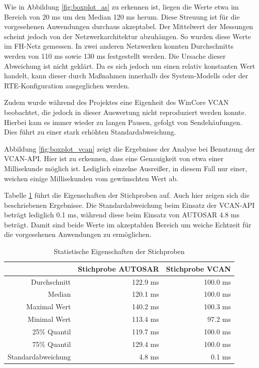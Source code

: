 \documentclass[
  a4paper,					    %
  twoside,
  DIV=calc,     				%
  bibliography=totoc,
  cleardoublepage=empty,
  ngerman,     					%
  final       					%
]{scrbook}
\begin{document}
Wie in Abbildung \ref{fig:boxplot_as} zu erkennen ist, liegen die Werte etwa im Bereich von 20 ms um den Median 120 ms herum. Diese Streuung ist für die vorgesehenen Anwendungen durchaus akzeptabel. Der Mittelwert der Messungen scheint jedoch von der Netzwerkarchitektur abzuhängen. So wurden diese Werte im FH-Netz gemessen. In zwei anderen Netzwerken konnten Durchschnitts werden von 110 ms sowie 130 ms festgestellt werden. Die Ursache dieser Abweichung ist nicht geklärt. Da es sich jedoch um einen relativ konstanten Wert handelt, kann dieser durch Maßnahmen innerhalb des System-Modells oder der RTE-Konfiguration ausgeglichen werden.

Zudem wurde während des Projektes eine Eigenheit des WinCore VCAN beobachtet, die jedoch in dieser Auswertung nicht reproduziert werden konnte. Hierbei kam es immer wieder zu langen Pausen, gefolgt von Sendehäufungen. Dies führt zu einer stark erhöhten Standardabweichung.

Abbildung \ref{fig:boxplot_vcan} zeigt die Ergebnisse der Analyse bei Benutzung der VCAN-API. Hier ist zu erkennen, dass eine Genauigkeit von etwa einer Millisekunde möglich ist. Lediglich einzelne Ausreißer, in diesem Fall nur einer, weichen einige Millisekunden vom gewünschten Wert ab.

Tabelle \ref{tab:jitter_statistik} führt die Eigenschaften der Stichproben auf. Auch hier zeigen sich die beschriebenen Ergebnisse. Die Standardabweichung beim Einsatz der VCAN-API beträgt lediglich 0.1 ms, während diese beim Einsatz von AUTOSAR 4.8 ms beträgt. Damit sind beide Werte im akzeptablen Bereich um weiche Echtzeit für die vorgesehenen Anwendungen zu ermöglichen.

\begin{table}[ht]
    \centering
    \begin{tabular}[h]{r  r r}
            & Stichprobe AUTOSAR & Stichprobe VCAN\\
        \toprule
        Durchschnitt        & 122.9 ms & 100.0 ms\\
        Median              & 120.1 ms & 100.0 ms\\
        Maximal Wert        & 140.2 ms & 100.3 ms\\
        Minimal Wert        & 113.4 ms & 97.2 ms\\
        25\% Quantil        & 119.7 ms & 100.0 ms\\
        75\% Quantil        & 129.4 ms & 100.0 ms\\
        Standardabweichung  & 4.8 ms & 0.1 ms\\
        \bottomrule
    \end{tabular}
    \caption{Statistische Eigenschaften der Stichproben}
    \label{tab:jitter_statistik}
\end{table}
\end{document}
